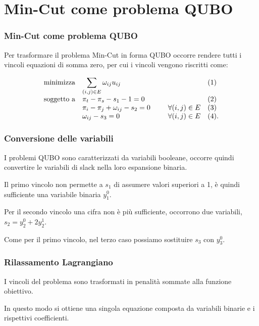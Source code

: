 \documentclass[10pt]{beamer}
\begin{document}
\section[Da CSP a QUBO]{Min-Cut come problema QUBO}
\begin{frame}
  \frametitle{Min-Cut come problema QUBO}

  Per trasformare il problema Min-Cut in forma QUBO occorre rendere tutti i vincoli equazioni di somma zero, per cui i vincoli vengono riscritti come:

  \begin{equation*}
    \begin{array}{ll@{}ll}
    \text{minimizza}    & \displaystyle\sum_{(i, j) \in E} \omega_{ij}u_{ij} &  &(1)\\
    \text{soggetto a}   & \displaystyle \pi_t - \pi_s - s_1 - 1 = 0 &   &(2)\\
                        & \displaystyle \pi_i - \pi_j  + \omega_{ij} - s_2 = 0\;\;\;\;\;\;\;\;\; & \forall (i,j) \in E & (3)\\
                        & \displaystyle \omega_{ij} - s_3 = 0 & \forall (i,j) \in E & (4).\\
  \end{array}
\end{equation*}

\end{frame}
\begin{frame}
  \frametitle{Conversione delle variabili}

  I problemi QUBO sono caratterizzati da variabili booleane, occorre quindi convertire le variabili di slack nella loro espansione binaria.

  Il primo vincolo non permette a $s_1$ di assumere valori superiori a 1, è quindi sufficiente una variabile binaria $y_1^0$.

  Per il secondo vincolo una cifra non è più sufficiente, occorrono due variabili, $s_2 = y_2^0 + 2y_2^1$.

  Come per il primo vincolo, nel terzo caso possiamo sostituire $s_3$ con $y_3^0$.

\end{frame}
\begin{frame}
  \frametitle{Rilassamento Lagrangiano}

  I vincoli del problema sono trasformati in penalità sommate alla funzione obiettivo.

  In questo modo si ottiene una singola equazione composta da variabili binarie e i rispettivi coefficienti.

\end{frame}
\end{document}
